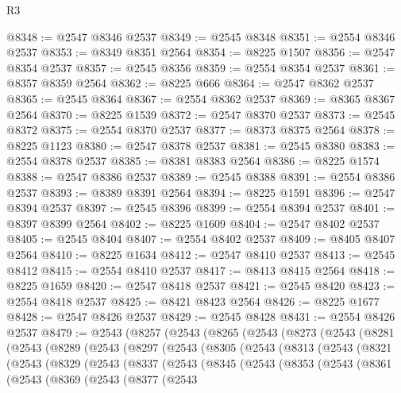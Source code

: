 \begin{lexlean}{R3}
\begin{coremodule}
@8348 := @2547 @8346 @2537
@8349 := @2545 @8348
@8351 := @2554 @8346 @2537
@8353 := @8349 @8351 @2564
@8354 := @8225 @1507
@8356 := @2547 @8354 @2537
@8357 := @2545 @8356
@8359 := @2554 @8354 @2537
@8361 := @8357 @8359 @2564
@8362 := @8225 @666
@8364 := @2547 @8362 @2537
@8365 := @2545 @8364
@8367 := @2554 @8362 @2537
@8369 := @8365 @8367 @2564
@8370 := @8225 @1539
@8372 := @2547 @8370 @2537
@8373 := @2545 @8372
@8375 := @2554 @8370 @2537
@8377 := @8373 @8375 @2564
@8378 := @8225 @1123
@8380 := @2547 @8378 @2537
@8381 := @2545 @8380
@8383 := @2554 @8378 @2537
@8385 := @8381 @8383 @2564
@8386 := @8225 @1574
@8388 := @2547 @8386 @2537
@8389 := @2545 @8388
@8391 := @2554 @8386 @2537
@8393 := @8389 @8391 @2564
@8394 := @8225 @1591
@8396 := @2547 @8394 @2537
@8397 := @2545 @8396
@8399 := @2554 @8394 @2537
@8401 := @8397 @8399 @2564
@8402 := @8225 @1609
@8404 := @2547 @8402 @2537
@8405 := @2545 @8404
@8407 := @2554 @8402 @2537
@8409 := @8405 @8407 @2564
@8410 := @8225 @1634
@8412 := @2547 @8410 @2537
@8413 := @2545 @8412
@8415 := @2554 @8410 @2537
@8417 := @8413 @8415 @2564
@8418 := @8225 @1659
@8420 := @2547 @8418 @2537
@8421 := @2545 @8420
@8423 := @2554 @8418 @2537
@8425 := @8421 @8423 @2564
@8426 := @8225 @1677
@8428 := @2547 @8426 @2537
@8429 := @2545 @8428
@8431 := @2554 @8426 @2537
@8479 := @2543
    (@8257
      (@2543
        (@8265
          (@2543
            (@8273
              (@2543
                (@8281
                  (@2543
                    (@8289
                      (@2543
                        (@8297
                          (@2543
                            (@8305
                              (@2543
                                (@8313
                                  (@2543
                                    (@8321
                                      (@2543
                                        (@8329
                                          (@2543
                                            (@8337
                                              (@2543
                                                (@8345
                                                  (@2543
                                                    (@8353
                                                      (@2543
                                                        (@8361
                                                          (@2543
                                                            (@8369
                                                              (@2543
                                                                (@8377
                                                                  (@2543

\end{coremodule}
\end{lexlean}
